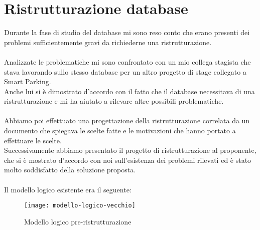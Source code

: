
\chapter{Ristrutturazione database}
\label{cap:ristrutturazione-database}


Durante la fase di studio del database mi sono reso conto che erano presenti dei problemi sufficientemente gravi 
da richiederne una ristrutturazione.
\\\\
Analizzate le problematiche mi sono confrontato con un mio collega stagista che stava lavorando sullo stesso database per
un altro progetto di stage collegato a Smart Parking.
\\
Anche lui si è dimostrato d'accordo con il fatto che il database necessitava di una ristrutturazione e mi ha aiutato a 
rilevare altre possibili
problematiche.
\\\\
Abbiamo poi effettuato una progettazione della ristrutturazione correlata da un documento che spiegava le scelte fatte
e le motivazioni che hanno portato a effettuare le scelte. 
\\
Successivamente abbiamo presentato il progetto di ristrutturazione al proponente, che si è mostrato d'accordo con
noi sull'esistenza dei problemi rilevati ed è stato molto soddisfatto della soluzione proposta.
\\\\
\clearpage
Il modello logico esistente era il seguente:
\begin{figure}[H]
  \centering
  \texttt{[image: modello-logico-vecchio]}
  \caption{Modello logico pre-ristrutturazione}
\end{figure}

